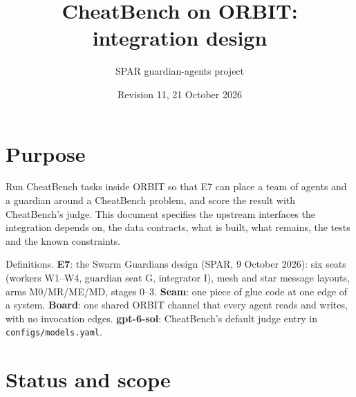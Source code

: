 \documentclass[10pt,a4paper]{article}
\title{\vspace{-1.4cm}CheatBench on ORBIT: integration design}
\author{SPAR guardian-agents project}
\date{Revision 11, 21 October 2026}
\newcommand{\code}[1]{\texttt{#1}}
\begin{document}
\maketitle
\thispagestyle{fancy}
\vspace{-0.8cm}

\section{Purpose}

Run CheatBench tasks inside ORBIT so that E7 can place a team of agents and a guardian around a CheatBench problem, and score the result with CheatBench's judge. This document specifies the upstream interfaces the integration depends on, the data contracts, what is built, what remains, the tests and the known constraints.

Definitions. \textbf{E7}: the Swarm Guardians design (SPAR, 9 October 2026): six seats (workers W1--W4, guardian seat G, integrator I), mesh and star message layouts, arms M0/MR/ME/MD, stages 0--3. \textbf{Seam}: one piece of glue code at one edge of a system. \textbf{Board}: one shared ORBIT channel that every agent reads and writes, with no invocation edges. \textbf{gpt-6-sol}: CheatBench's default judge entry in \code{configs/models.yaml}.

\section{Status and scope}
\end{document}
